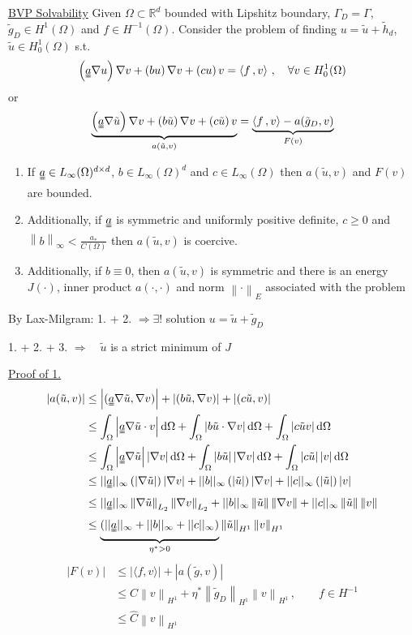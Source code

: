 \documentclass[letterpaper]{article}
\providecommand{\abs}[1]{\left\lvert#1\right\rvert}
\providecommand{\norm}[1]{\left\lVert#1\right\rVert}
\providecommand{\inner}[1]{\left(#1\right)}
\providecommand{\ainner}[2]{\left\langle#1\,,#2\right\rangle}
\def\d{\mathrm{d}}
\begin{document}
\begin{multicols}{2}
\uline{BVP Solvability} Given $\Omega\subset\mathbb{R}^d$ bounded with Lipshitz
boundary, $\Gamma_D=\Gamma$, $\tilde g_D\in H^1(\Omega)$ and $f\in
H^{-1}(\Omega)$. Consider the problem of finding $u=\tilde u+\tilde h_d$,
$\tilde u\in H_0^1(\Omega)$ s.t.
\[
\inner{\uuline{a}\nabla u}{\nabla v}+\inner{bu}{\nabla
v}+\inner{cu}{v}=\ainner{f}{v}\,,\quad \forall v\in H_0^1(\Omega)
\]
or 
\[
\underbrace{\inner{\uuline{a}\nabla\tilde u}{\nabla v}+\inner{b\tilde u}{\nabla
v}+\inner{c\tilde u}{v}}_{a(\tilde u,v)}
=\underbrace{\ainner{f}{v}-a(\tilde g_D,v)}_{F(v)}
\]
\begin{enumerate}
\item If $\uuline{a}\in L_\infty(\Omega)^{d\times d}$, $b\in L_\infty(\Omega)^d$
and $c\in L_\infty(\Omega)$ then $a(\tilde u, v)$ and $F(v)$ are bounded.
\item Additionally, if $\uuline{a}$ is symmetric and uniformly positive
definite, $c\ge0$ and $\norm{b}_\infty<\frac{a_*}{C(\Omega)}$ then $a(\tilde
u,v)$ is coercive.
\item Additionally, if $b\equiv 0$, then $a(\tilde u,v)$ is symmetric and there
is an energy $J(\cdot)$, inner product $a(\cdot,\cdot)$ and norm
$\norm{\cdot}_E$ associated with the problem
\end{enumerate}
By Lax-Milgram: 1. + 2. $\Rightarrow\exists!$ solution $u=\tilde u+\tilde g_D$

1. + 2. + 3. $\Rightarrow\quad\tilde u$ is a strict minimum of $J$

\uline{Proof of 1.}
\begin{align*}
\abs{a(\tilde u,v)}&\le\abs{(\uuline{a}\nabla\tilde u,\nabla v)}
+\abs{(b\tilde u,\nabla v)}+\abs{(c\tilde u,v)}\\
&\le\int_\Omega\abs{\uuline{a}\nabla\tilde u\cdot v}\d\Omega
+\int_\Omega\abs{b\tilde u\cdot \nabla v}\d\Omega
+\int_\Omega\abs{c\tilde u v}\d\Omega\\
&\le\int_\Omega\abs{\uuline{a}\nabla\tilde u}\abs{\nabla v}\d\Omega
+\int_\Omega\abs{b\tilde u}\abs{\nabla v}\d\Omega
+\int_\Omega\abs{c\tilde u}\abs{v}\d\Omega\\
&\le||\uuline{a}||_\infty\inner{\abs{\nabla\tilde u}}{\abs{\nabla v}}
+||b||_\infty\inner{\abs{\tilde u}}{\abs{\nabla v}}
+||c||_\infty\inner{\abs{\tilde u}}{\abs{v}}\\
&\le||\uuline{a}||_\infty\norm{\nabla \tilde u}_{L_2}\norm{\nabla v}_{L_2}
+||b||_\infty\norm{\tilde u}\norm{\nabla v}
+||c||_\infty\norm{\tilde u}\norm{v}\\
&\le\underbrace{(||\uuline{a}||_\infty+||b||_\infty+||c||_\infty)}_{\eta^*>0}
\norm{\tilde u}_{H^1}\norm{v}_{H^1}\\
\end{align*}
\begin{align*}
\abs{F(v)}&\le\abs{\langle f,v\rangle}+\abs{a(\tilde g,v)}\\
&\le C\norm{v}_{H^1}+\eta^*\norm{\tilde g_D}_{H^1}\norm{v}_{H^1}\,,\quad\quad f\in H^{-1}\\
&\le \hat C\norm{v}_{H^1}
\end{align*}


\end{multicols}
\end{document}
